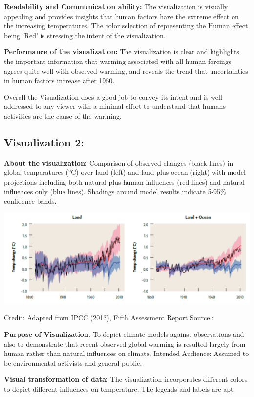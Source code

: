 \documentclass[]{book}
\begin{document}
\textbf{Readability and Communication ability:} The visualization is visually appealing and provides insights that human factors have the extreme effect on the increasing temperatures. The color selection of representing the Human effect being `Red' is stressing the intent of the visualization.

\textbf{Performance of the visualization:} The visualization is clear and highlights the important information that warming associated with all human forcings agrees quite well with observed warming, and reveals the trend that uncertainties in human factors increase after 1960.

Overall the Visualization does a good job to convey its intent and is well addressed to any viewer with a minimal effort to understand that humans activities are the cause of the warming.

\hypertarget{visualization-2}{%
\subsection{Visualization 2:}\label{visualization-2}}

\textbf{About the visualization:} Comparison of observed changes (black lines) in global temperatures (°C) over land (left) and land plus ocean (right) with model projections including both natural plus human influences (red lines) and natural influences only (blue lines). Shadings around model results indicate 5-95\% confidence bands.

\includegraphics{images/Vz3-LandOcean.png}

Credit: Adapted from IPCC (2013), Fifth Assessment Report
Source : \citep{Land_Ocean}

\textbf{Purpose of Visualization:} To depict climate models against observations and also to demonstrate that recent observed global warming is resulted largely from human rather than natural influences on climate.
Intended Audience: Assumed to be environmental activists and general public.

\textbf{Visual transformation of data:} The visualization incorporates different colors to depict different influences on temperature. The legends and labels are apt.
\end{document}
